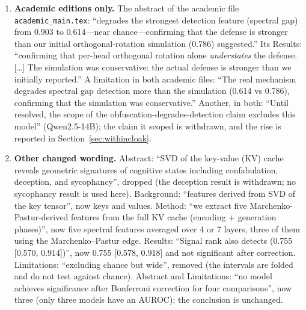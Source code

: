 \documentclass[11pt,a4paper]{article}
\begin{document}
\begin{enumerate}
\item \textbf{Academic editions only.} The abstract of the academic file
\nolinkurl{academic_main.tex}: ``degrades the strongest detection feature
(spectral gap) from 0.903 to 0.614---near chance---confirming that the
defense is stronger than our initial orthogonal-rotation simulation
(0.786) suggested.'' Its Results: ``confirming that per-head orthogonal
rotation alone \emph{understates} the defense. [\ldots] The simulation was
conservative: the actual defense is stronger than we initially
reported.'' A limitation in both academic files: ``The real mechanism
degrades spectral gap detection more than the simulation (0.614 vs
0.786), confirming that the simulation was conservative.'' Another, in
both: ``Until resolved, the scope of the obfuscation-degrades-detection
claim excludes this model'' (Qwen2.5-14B); the claim it scoped is
withdrawn, and the rise is reported in Section~\ref{sec:withincloak}.

\item \textbf{Other changed wording.} Abstract: ``SVD of the key-value
(KV) cache reveals geometric signatures of cognitive states including
confabulation, deception, and sycophancy'', dropped (the deception result
is withdrawn; no sycophancy result is used here). Background:
``features derived from SVD of the key tensor'', now keys and values.
Method: ``we extract five Marchenko-Pastur-derived features from the full
KV cache (encoding + generation phases)'', now five spectral features
averaged over 4 or 7 layers, three of them using the Marchenko--Pastur
edge. Results: ``Signal rank also detects (0.755 [0.570, 0.914])'', now
0.755 [0.578, 0.918] and not significant after correction. Limitations:
``excluding chance but wide'', removed (the intervals are folded and do
not test against chance). Abstract and Limitations: ``no model achieves
significance after Bonferroni correction for four comparisons'', now three
(only three models have an AUROC); the conclusion is unchanged.
\end{enumerate}
\end{document}
